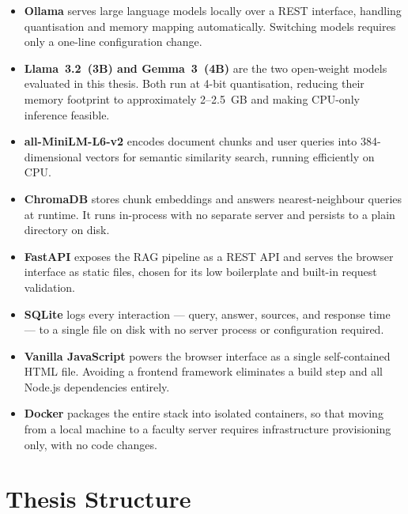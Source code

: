\begin{itemize}
    \item \textbf{Ollama} serves large language models locally over a REST
        interface, handling quantisation and memory mapping automatically.
        Switching models requires only a one-line configuration change.

    \item \textbf{Llama~3.2~(3B) and Gemma~3~(4B)} are the two open-weight
        models evaluated in this thesis. Both run at 4-bit quantisation,
        reducing their memory footprint to approximately 2--2.5~GB and
        making CPU-only inference feasible.

    \item \textbf{all-MiniLM-L6-v2} encodes document chunks and user queries
        into 384-dimensional vectors for semantic similarity search, running
        efficiently on CPU.

    \item \textbf{ChromaDB} stores chunk embeddings and answers
        nearest-neighbour queries at runtime. It runs in-process with no
        separate server and persists to a plain directory on disk.

    \item \textbf{FastAPI} exposes the RAG pipeline as a REST API and serves
        the browser interface as static files, chosen for its low boilerplate
        and built-in request validation.

    \item \textbf{SQLite} logs every interaction --- query, answer, sources,
        and response time --- to a single file on disk with no server process
        or configuration required.

    \item \textbf{Vanilla JavaScript} powers the browser interface as a
        single self-contained HTML file. Avoiding a frontend framework
        eliminates a build step and all Node.js dependencies entirely.

    \item \textbf{Docker} packages the entire stack into isolated containers,
        so that moving from a local machine to a faculty server requires
        infrastructure provisioning only, with no code changes.
\end{itemize}

\section{Thesis Structure}
\label{sec:intro-structure}

